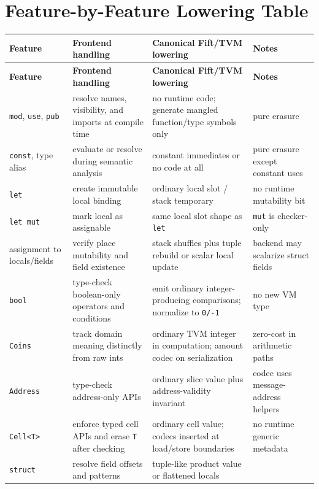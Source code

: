 \documentclass[12pt,oneside]{article}
\begin{document}
\section{Feature-by-Feature Lowering Table}
\begingroup
\setlength{\tabcolsep}{4pt}
\footnotesize
\begin{longtable}{|L{0.15\textwidth}|L{0.24\textwidth}|L{0.24\textwidth}|L{0.15\textwidth}|}
\hline
\textbf{Feature} & \textbf{Frontend handling} & \textbf{Canonical Fift/TVM lowering} & \textbf{Notes} \\ \hline
\endfirsthead
\hline
\textbf{Feature} & \textbf{Frontend handling} & \textbf{Canonical Fift/TVM lowering} & \textbf{Notes} \\ \hline
\endhead
\texttt{mod}, \texttt{use}, \texttt{pub} &
resolve names, visibility, and imports at compile time &
no runtime code; generate mangled function/type symbols only &
pure erasure \\ \hline
\texttt{const}, type alias &
evaluate or resolve during semantic analysis &
constant immediates or no code at all &
pure erasure except constant uses \\ \hline
\texttt{let} &
create immutable local binding &
ordinary local slot / stack temporary &
no runtime mutability bit \\ \hline
\texttt{let mut} &
mark local as assignable &
same local slot shape as \texttt{let} &
\texttt{mut} is checker-only \\ \hline
assignment to locals/fields &
verify place mutability and field existence &
stack shuffles plus tuple rebuild or scalar local update &
backend may scalarize struct fields \\ \hline
\texttt{bool} &
type-check boolean-only operators and conditions &
emit ordinary integer-producing comparisons; normalize to \texttt{0/-1} &
no new VM type \\ \hline
\texttt{Coins} &
track domain meaning distinctly from raw ints &
ordinary TVM integer in computation; amount codec on serialization &
zero-cost in arithmetic paths \\ \hline
\texttt{Address} &
type-check address-only APIs &
ordinary slice value plus address-validity invariant &
codec uses message-address helpers \\ \hline
\texttt{Cell<T>} &
enforce typed cell APIs and erase \texttt{T} after checking &
ordinary cell value; codecs inserted at load/store boundaries &
no runtime generic metadata \\ \hline
\texttt{struct} &
resolve field offsets and patterns &
tuple-like product value or flattened locals &

\end{longtable}
\end{document}
